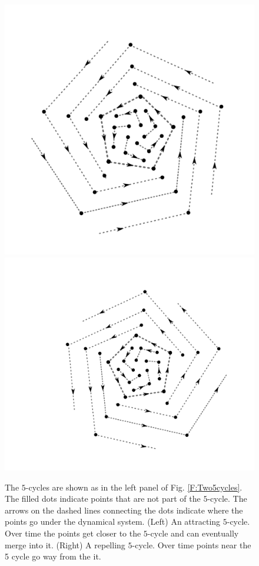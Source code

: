 \begin{figure}[h]
\centering
\includegraphics[scale=0.333]{./images/Attracting5-cycle.pdf}
\includegraphics[scale=0.333]{./images/Repelling5-cycle.pdf}
\caption[Scott Hotton.]{The $5$-cycles are shown as in the left panel of Fig. 
\ref{F:Two5cycles}.  The filled dots indicate points that are not part of the 
$5$-cycle.  The arrows on the dashed lines connecting the dots indicate where 
the points go under the dynamical system.  (Left) An attracting $5$-cycle.  
Over time the points get closer to the $5$-cycle and can eventually merge into it. (Right) A repelling $5$-cycle.  
Over time points near the 5 cycle go way from the it.}
\label{F:Attracting5cycle}
\end{figure}

